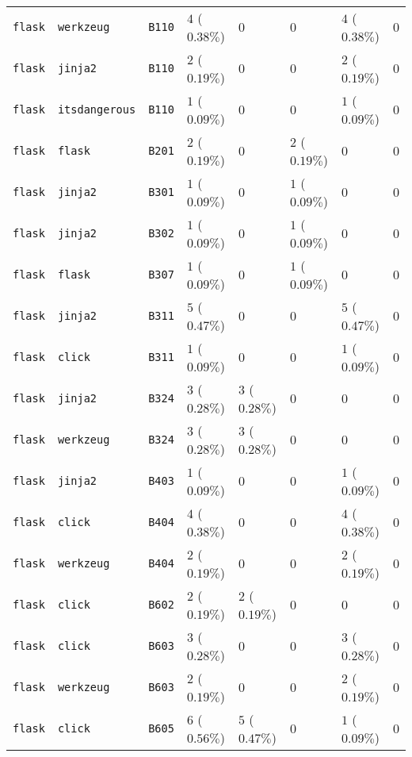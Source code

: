 \begin{table}
\begin{tabular}{llllllll}
\texttt{flask} & \texttt{werkzeug} & \texttt{B110} & $4$ ($0.38\%$) & $0$ & $0$ & $4$ ($0.38\%$) & $0$ \\
\texttt{flask} & \texttt{jinja2} & \texttt{B110} & $2$ ($0.19\%$) & $0$ & $0$ & $2$ ($0.19\%$) & $0$ \\
\texttt{flask} & \texttt{itsdangerous} & \texttt{B110} & $1$ ($0.09\%$) & $0$ & $0$ & $1$ ($0.09\%$) & $0$ \\
\texttt{flask} & \texttt{flask} & \texttt{B201} & $2$ ($0.19\%$) & $0$ & $2$ ($0.19\%$) & $0$ & $0$ \\
\texttt{flask} & \texttt{jinja2} & \texttt{B301} & $1$ ($0.09\%$) & $0$ & $1$ ($0.09\%$) & $0$ & $0$ \\
\texttt{flask} & \texttt{jinja2} & \texttt{B302} & $1$ ($0.09\%$) & $0$ & $1$ ($0.09\%$) & $0$ & $0$ \\
\texttt{flask} & \texttt{flask} & \texttt{B307} & $1$ ($0.09\%$) & $0$ & $1$ ($0.09\%$) & $0$ & $0$ \\
\texttt{flask} & \texttt{jinja2} & \texttt{B311} & $5$ ($0.47\%$) & $0$ & $0$ & $5$ ($0.47\%$) & $0$ \\
\texttt{flask} & \texttt{click} & \texttt{B311} & $1$ ($0.09\%$) & $0$ & $0$ & $1$ ($0.09\%$) & $0$ \\
\texttt{flask} & \texttt{jinja2} & \texttt{B324} & $3$ ($0.28\%$) & $3$ ($0.28\%$) & $0$ & $0$ & $0$ \\
\texttt{flask} & \texttt{werkzeug} & \texttt{B324} & $3$ ($0.28\%$) & $3$ ($0.28\%$) & $0$ & $0$ & $0$ \\
\texttt{flask} & \texttt{jinja2} & \texttt{B403} & $1$ ($0.09\%$) & $0$ & $0$ & $1$ ($0.09\%$) & $0$ \\
\texttt{flask} & \texttt{click} & \texttt{B404} & $4$ ($0.38\%$) & $0$ & $0$ & $4$ ($0.38\%$) & $0$ \\
\texttt{flask} & \texttt{werkzeug} & \texttt{B404} & $2$ ($0.19\%$) & $0$ & $0$ & $2$ ($0.19\%$) & $0$ \\
\texttt{flask} & \texttt{click} & \texttt{B602} & $2$ ($0.19\%$) & $2$ ($0.19\%$) & $0$ & $0$ & $0$ \\
\texttt{flask} & \texttt{click} & \texttt{B603} & $3$ ($0.28\%$) & $0$ & $0$ & $3$ ($0.28\%$) & $0$ \\
\texttt{flask} & \texttt{werkzeug} & \texttt{B603} & $2$ ($0.19\%$) & $0$ & $0$ & $2$ ($0.19\%$) & $0$ \\
\texttt{flask} & \texttt{click} & \texttt{B605} & $6$ ($0.56\%$) & $5$ ($0.47\%$) & $0$ & $1$ ($0.09\%$) & $0$ \\

\end{tabular}
\end{table}
